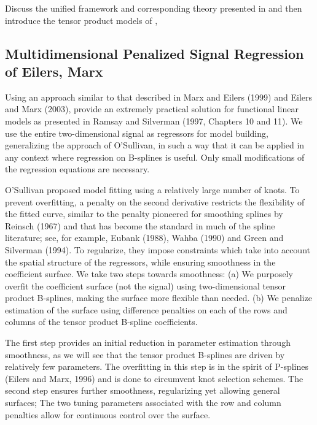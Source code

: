 \documentclass[12pt]{article}
\newcommand*\needsparaphrased{\color{red}}
\newcommand*\outlineskeleton{\color{green}}
\begin{document}
{\outlineskeleton Discuss the unified framework and corresponding theory presented in \cite{huang2001concave} and then introduce the tensor product models of \cite{eilers2003multivariate}, \cite{marx2005multidimensional}}


\subsection{{\outlineskeleton Multidimensional Penalized Signal Regression of Eilers, Marx}}

{\needsparaphrased Using an approach similar to that described in Marx and Eilers (1999) and Eilers and Marx (2003), \cite{marx2005multidimensional} provide an extremely practical solution for functional linear models as presented in Ramsay and Silverman (1997, Chapters 10 and 11). We use the entire two-dimensional signal as regressors for model building, generalizing the approach of O'Sullivan, in such a way that it can be applied in any context where regression on B-splines is useful. Only small modifications of the regression equations are necessary. 

O'Sullivan proposed model fitting using a relatively large number of knots. To prevent overfitting, a penalty on the second derivative restricts the flexibility of the fitted curve, similar to the penalty pioneered for smoothing splines by Reinsch (1967) and that has become the standard in much of the spline literature; see, for example, Eubank (1988), Wahba (1990) and Green and Silverman (1994). To regularize, they impose constraints which take into account the spatial structure of the regressors, while ensuring smoothness in the coefficient surface. We take two steps towards smoothness: (a) We purposely overfit the coefficient surface (not the signal) using two-dimensional tensor product B-splines, making the surface more flexible than needed. (b) We penalize estimation of the surface using difference penalties on each of the rows and columns of the tensor product B-spline coefficients.

The first step provides an initial reduction in parameter estimation through smoothness, as we will see that the tensor product B-splines are driven by relatively few parameters. The overfitting in this step is in the spirit of P-splines (Eilers and Marx, 1996) and is done to circumvent knot selection schemes. The second step ensures further smoothness, regularizing yet allowing general surfaces; The two tuning parameters associated with the row and column penalties allow for continuous control over the surface. 

}
\end{document}
